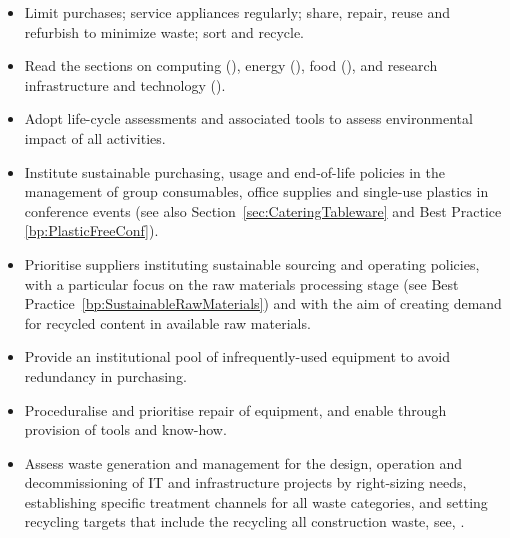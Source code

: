 \documentclass[../SustainableHEP.tex]{subfiles}
\begin{document}
\clearpage
\begin{reco2}{\currentname}
{
\begin{itemize}[leftmargin=3.5 mm]
\item Limit purchases; service appliances regularly; share, repair, reuse and refurbish to minimize waste; sort and recycle.

\item Read the sections on computing (), energy (), food (), and research infrastructure and technology ().
\end{itemize}
}
{
\begin{itemize}[leftmargin=3.5 mm]
\item Adopt life-cycle assessments and associated tools to assess environmental impact of all activities.

\item Institute sustainable purchasing, usage and end-of-life policies in the management of group consumables,  office supplies and single-use plastics \eg in conference events (see also Section~\ref{sec:CateringTableware} and Best Practice \ref{bp:PlasticFreeConf}).
\end{itemize}
}
{
\begin{itemize}[leftmargin=3.5 mm]

\item Prioritise suppliers instituting sustainable sourcing and operating policies, with a particular focus on the raw materials processing stage (see Best Practice~\ref{bp:SustainableRawMaterials}) and with the aim of creating demand for recycled content in available raw materials.

\item Provide an institutional pool of infrequently-used equipment to avoid redundancy in purchasing.

\item Proceduralise and prioritise repair of equipment, and enable through provision of tools and know-how.

\item Assess waste generation and management for the design, operation and decommissioning of IT and infrastructure projects by right-sizing needs, establishing specific treatment channels for all waste categories, and setting recycling targets that include the recycling all construction waste, see, \eg {}.  


\end{itemize}}
\end{reco2}
\end{document}
